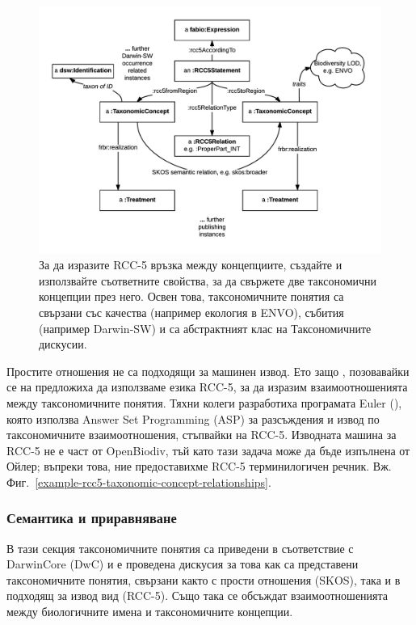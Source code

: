 \begin{figure}[h!]
\centering
  \includegraphics[width=\textwidth]{Figures/taxonomic-concept-relationships-diagram}
  \decoRule
  \caption[Taxonomic concept relationships diagram.]{За да изразите RCC-5 връзка между концепциите, създайте  и използвайте съответните свойства, за да свържете две таксономични концепции през него. Освен това, таксономичните понятия са свързани със качества (например екология в ENVO), събития (например Darwin-SW) и са абстрактният клас на Таксономичните дискусии.}
  \label{taxonomic-concept-relationships-diagram}
\end{figure}

Простите отношения не са подходящи за машинен извод. Ето защо \cite{franz_perspectives:_2009}, позовавайки се на \cite{koperski_referenzliste_2000} предложиха да използваме езика RCC-5, за да изразим взаимоотношенията между таксономичните понятия. Тяхни колеги разработиха програмата Euler (\cite{chen_euler/x:_2014}), която използва Answer Set Programming (ASP) за разсъждения и извод по таксономичните взаимоотношения, стъпвайки на RCC-5. Изводната машина за RCC-5 не е част от OpenBiodiv, тъй като тази задача може да бъде изпълнена от Ойлер; въпреки това, ние предоставихме RCC-5 терминилогичен речник. Вж. Фиг.~\ref{example-rcc5-taxonomic-concept-relationships}.

\subsubsection{Семантика и приравняване}

В тази секция таксономичните понятия са приведени в съответствие с DarwinCore (DwC) и е проведена дискусия за това как са представени таксономичните понятия, свързани както с прости отношения (SKOS), така и в подходящ за извод вид (RCC-5). Също така се обсъждат взаимоотношенията между биологичните имена и таксономичните концепции.



